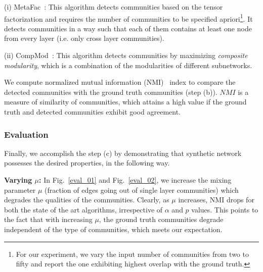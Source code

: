 (i) MetaFac~\cite{metafac}: This algorithm detects communities based on the tensor factorization and requires the number of
  communities to be specified apriori\footnote{For our experiment, we vary the input number of communities from two to fifty and report
  the one exhibiting highest overlap
 with the ground truth.}. It detects communities in a way such that each of them contains at least one node from every 
 layer (i.e. only cross layer communities). 

(ii) CompMod~\cite{CompMod}: This algorithm detects communities by maximizing \emph{composite modularity}, which is a
  combination of the modularities of different subnetworks.

We compute normalized mutual information (NMI)~\cite{danon2005comparing} index to compare the detected communities with the ground truth
communities (step (b)). $NMI$ is a measure of similarity of communities, which attains a high value if the ground truth and detected
communities
exhibit good agreement.



\subsubsection{Evaluation}
Finally, we accomplish the step (c) by demonstrating that synthetic network possesses the desired properties, in the following way.

\textbf{Varying $\mu$:} In Fig.~\ref{eval_01} and Fig.~\ref{eval_02}, we increase the mixing
parameter $\mu$ (fraction of edges going out of single layer communities) which degrades the qualities of the communities.
Clearly, as $\mu$ increases, NMI drops for both the state of the art algorithms, irrespective of $\alpha$ and $p$ values.
This points to the fact that with increasing $\mu$, the ground truth communities degrade independent of the type of communities,
which meets our expectation.

